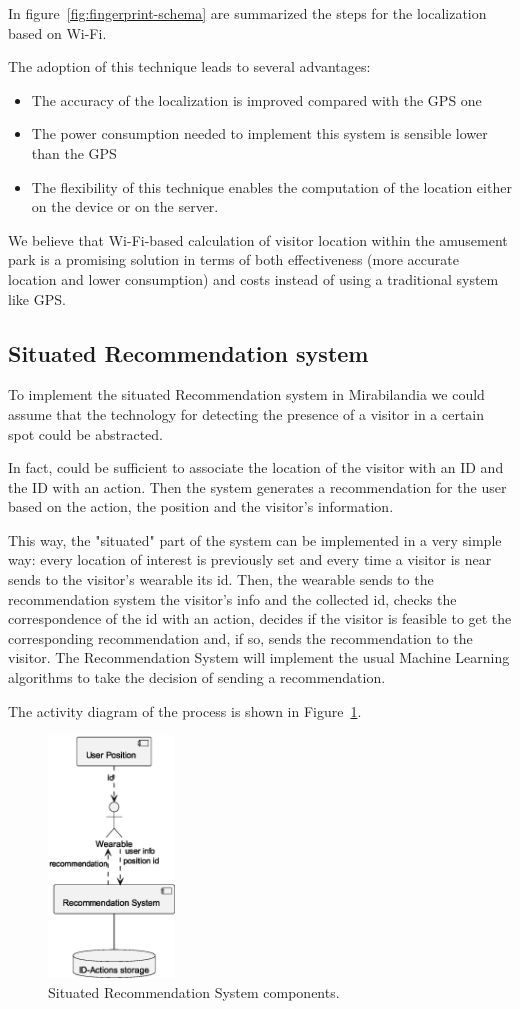 In figure~\ref{fig:fingerprint-schema} are summarized the steps for the localization based on Wi-Fi.

The adoption of this technique leads to several advantages:
\begin{itemize}
	\item The accuracy of the localization is improved compared with the GPS one~\cite{du2018hybrid}
	\item The power consumption needed to implement this system is sensible lower than the GPS~\cite{du2018hybrid}
	\item The flexibility of this technique enables the computation of the location either on the device or on the server.
\end{itemize}

We believe that Wi-Fi-based calculation of visitor location within the amusement park is a promising solution in terms of both effectiveness (more
accurate location and lower consumption) and costs instead of using a traditional system like GPS.


\subsection{Situated Recommendation system}
To implement the situated Recommendation system in Mirabilandia we could assume that the technology for detecting the presence of a visitor in a certain spot could be abstracted.

In fact, could be sufficient to associate the location of the visitor with an ID and the ID with an action. Then the system generates a recommendation for the user based on the action, the position and the visitor's information.

This way, the "situated" part of the system can be implemented in a very simple way:
every location of interest is previously set and every time a visitor is near sends to the visitor's wearable its id.
Then, the wearable sends to the recommendation system the visitor's info and the collected id, checks the correspondence of the id with an action, decides if the visitor is feasible to get the corresponding recommendation and, if so, sends the recommendation to the visitor.
The Recommendation System will implement the usual Machine Learning algorithms to take the decision of sending a recommendation.

The activity diagram of the process is shown in Figure~\ref{fig:situated-recommendation}.

\begin{figure}[H]
	\centering
	\includegraphics[width=0.3\textwidth]{img/situated-recommendation.eps}
	\caption{Situated Recommendation System components.}
	\label{fig:situated-recommendation}
\end{figure}
